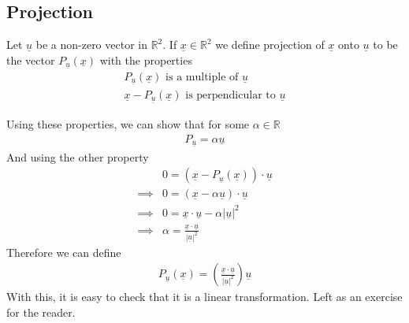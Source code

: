 \documentclass[a4paper]{article}
\theoremstyle{plain}
\theoremstyle{definition}
\newtheorem{defn}{Definition}[section]
\theoremstyle{remark}
\begin{document}
\subsection{Projection}
\begin{tcolorbox}[colback=black!3!white,colframe=black!60!white,title=\begin{defn}Projection \label{Projection}\end{defn}]
Let $\underline{u}$ be a non-zero vector in $\mathbb{R}^2$. If $\underline{x} \in \mathbb{R}^2$ we define projection of $\underline{x}$ onto $\underline{u}$ to be the vector $P_{\underline{u}}(\underline{x})$ with the properties
\begin{align}
P_{\underline{u}}(\underline{x}) \text{ is a multiple of $\underline{u}$} \\
\underline{x}-P_{\underline{u}}(\underline{x}) \text{ is perpendicular to $\underline{u}$}
\end{align}
\end{tcolorbox}
Using these properties, we can show that for some $\alpha \in \mathbb{R}$
\begin{align*}
	P_{\underline{u}}=\alpha\underline{u}
\end{align*}
And using the other property 
\begin{align*}
	&0 = (\underline{x}-P_{\underline{u}}(\underline{x})) \cdot \underline{u}\\
	\implies& 0=(\underline{x} - \alpha \underline{u}) \cdot\underline{u} \\
	\implies& 0 = \underline{x} \cdot \underline{u} - \alpha |\underline{u}|^2\\
	\implies& \alpha =\frac{\underline{x} \cdot\underline{u}}{|\underline{u}|^2}
\end{align*}
Therefore we can define
\begin{align*}
	P_{\underline{u}}(\underline{x}) = \left( \frac{\underline{x} \cdot\underline{u}}{|\underline{u}|^2} \right) \underline{u}

\end{align*}
With this, it is easy to check that it is a linear transformation. Left as an exercise for the reader.
\end{document}
